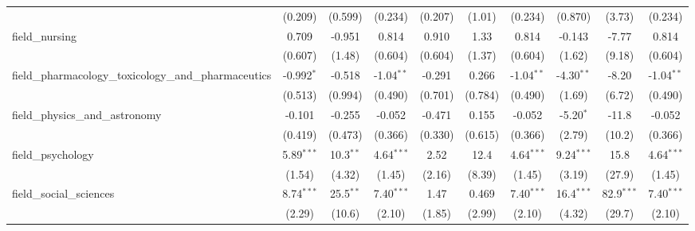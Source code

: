 \begin{tabular}{lccccccccc}
                                                               & (0.209)        & (0.599)        & (0.234)        & (0.207)        & (1.01)        & (0.234)        & (0.870)        & (3.73)        & (0.234)\\   
   field\_nursing                                              & 0.709          & -0.951         & 0.814          & 0.910          & 1.33          & 0.814          & -0.143         & -7.77         & 0.814\\   
                                                               & (0.607)        & (1.48)         & (0.604)        & (0.604)        & (1.37)        & (0.604)        & (1.62)         & (9.18)        & (0.604)\\   
   field\_pharmacology\_toxicology\_and\_pharmaceutics         & -0.992$^{*}$   & -0.518         & -1.04$^{**}$   & -0.291         & 0.266         & -1.04$^{**}$   & -4.30$^{**}$   & -8.20         & -1.04$^{**}$\\   
                                                               & (0.513)        & (0.994)        & (0.490)        & (0.701)        & (0.784)       & (0.490)        & (1.69)         & (6.72)        & (0.490)\\   
   field\_physics\_and\_astronomy                              & -0.101         & -0.255         & -0.052         & -0.471         & 0.155         & -0.052         & -5.20$^{*}$    & -11.8         & -0.052\\   
                                                               & (0.419)        & (0.473)        & (0.366)        & (0.330)        & (0.615)       & (0.366)        & (2.79)         & (10.2)        & (0.366)\\   
   field\_psychology                                           & 5.89$^{***}$   & 10.3$^{**}$    & 4.64$^{***}$   & 2.52           & 12.4          & 4.64$^{***}$   & 9.24$^{***}$   & 15.8          & 4.64$^{***}$\\   
                                                               & (1.54)         & (4.32)         & (1.45)         & (2.16)         & (8.39)        & (1.45)         & (3.19)         & (27.9)        & (1.45)\\   
   field\_social\_sciences                                     & 8.74$^{***}$   & 25.5$^{**}$    & 7.40$^{***}$   & 1.47           & 0.469         & 7.40$^{***}$   & 16.4$^{***}$   & 82.9$^{***}$  & 7.40$^{***}$\\   
                                                               & (2.29)         & (10.6)         & (2.10)         & (1.85)         & (2.99)        & (2.10)         & (4.32)         & (29.7)        & (2.10)\\   

\end{tabular}
